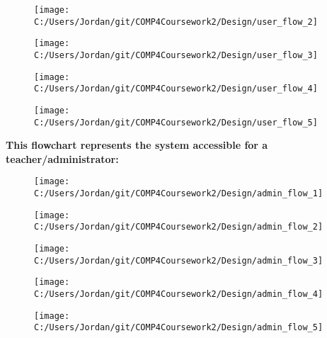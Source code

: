 \begin{figure}[H]
    \texttt{[image: C:/Users/Jordan/git/COMP4Coursework2/Design/user\_flow\_2]}
    \label{fig:print_function_result}\caption{}
\end{figure}

\begin{figure}[H]
    \texttt{[image: C:/Users/Jordan/git/COMP4Coursework2/Design/user\_flow\_3]}
    \label{fig:print_function_result}\caption{}
\end{figure}

\begin{figure}[H]
    \texttt{[image: C:/Users/Jordan/git/COMP4Coursework2/Design/user\_flow\_4]}
    \label{fig:print_function_result}\caption{}
\end{figure}

\begin{figure}[H]
    \texttt{[image: C:/Users/Jordan/git/COMP4Coursework2/Design/user\_flow\_5]}
    \label{fig:print_function_result}\caption{}
\end{figure}

\textbf{This flowchart represents the system accessible for a teacher/administrator: }

\begin{figure}[H]
    \texttt{[image: C:/Users/Jordan/git/COMP4Coursework2/Design/admin\_flow\_1]}
    \label{fig:print_function_result}\caption{}
\end{figure}

\begin{figure}[H]
    \texttt{[image: C:/Users/Jordan/git/COMP4Coursework2/Design/admin\_flow\_2]}
    \label{fig:print_function_result}\caption{}
\end{figure}

\begin{figure}[H]
    \texttt{[image: C:/Users/Jordan/git/COMP4Coursework2/Design/admin\_flow\_3]}
    \label{fig:print_function_result}\caption{}
\end{figure}

\begin{figure}[H]
    \texttt{[image: C:/Users/Jordan/git/COMP4Coursework2/Design/admin\_flow\_4]}
    \label{fig:print_function_result}\caption{}
\end{figure}

\begin{figure}[H]
    \texttt{[image: C:/Users/Jordan/git/COMP4Coursework2/Design/admin\_flow\_5]}
    \label{fig:print_function_result}\caption{}
\end{figure}


